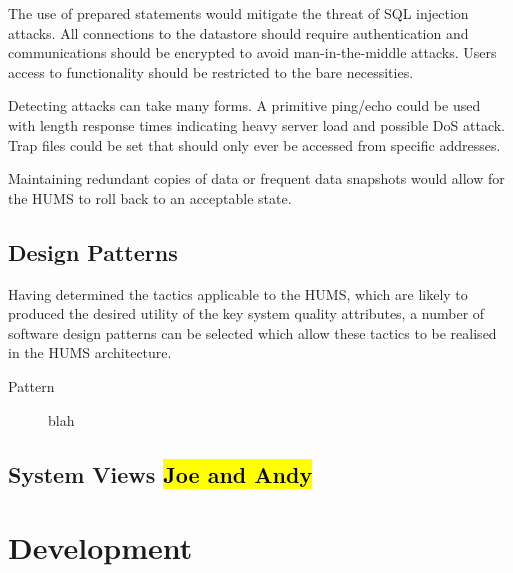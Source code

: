 \documentclass[10pt,a4paper]{article}
\begin{document}
\begin{description}
\begin{description}[noitemsep]
	\end{description}
\item[Security] \hfill
	\begin{description}[noitemsep]
	\item[Resisting Attacks] The use of prepared statements would mitigate the threat of SQL injection attacks. All connections to the datastore should require authentication and communications should be encrypted to avoid man-in-the-middle attacks. Users access to functionality should be restricted to the bare necessities. 
	\item[Detecting Attacks] Detecting attacks can take many forms. A primitive ping/echo could be used with length response times indicating heavy server load and possible DoS attack. Trap files could be set that should only ever be accessed from specific addresses.
	\item[Recovering From Attacks] Maintaining redundant copies of data or frequent data snapshots would allow for the HUMS to roll back to an acceptable state.
	\end{description}
\end{description}

\subsection{Design Patterns}
Having determined the tactics applicable to the HUMS, which are likely to produced the desired utility of the key system quality attributes, a number of software design patterns can be selected which allow these tactics to be realised in the HUMS architecture.

\begin{description}
\item[Pattern] blah
\end{description}

\subsection{System Views \hl{Joe and Andy}} 
\label{sec:views}
\section{Development}
\label{sec:dev}
\end{document}
